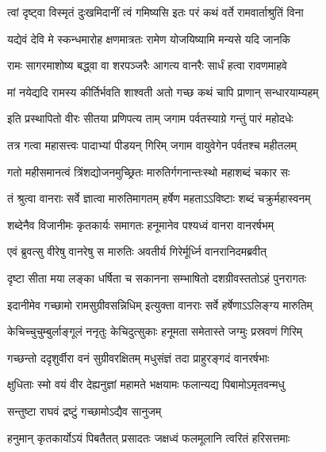 \twolineshloka
{त्वां दृष्ट्वा विस्मृतं दुःखमिदानीं त्वं गमिष्यसि}
{इतः परं कथं वर्ते रामवार्ताश्रुतिं विना} %


\twolineshloka
{यद्येवं देवि मे स्कन्धमारोह क्षणमात्रतः}
{रामेण योजयिष्यामि मन्यसे यदि जानकि} %


\twolineshloka
{रामः सागरमाशोष्य बद्\mbox{}ध्वा वा शरपञ्जरैः}
{आगत्य वानरैः सार्धं हत्वा रावणमाहवे} %

\twolineshloka
{मां नयेद्यदि रामस्य कीर्तिर्भवति शाश्वती}
{अतो गच्छ कथं चापि प्राणान् सन्धारयाम्यहम्} %

\twolineshloka
{इति प्रस्थापितो वीरः सीतया प्रणिपत्य ताम्}
{जगाम पर्वतस्याग्रे गन्तुं पारं महोदधेः} %

\twolineshloka
{तत्र गत्वा महासत्त्वः पादाभ्यां पीडयन् गिरिम्}
{जगाम वायुवेगेन पर्वतश्च महीतलम्} %

\twolineshloka
{गतो महीसमानत्वं त्रिंशद्योजनमुच्छ्रितः}
{मारुतिर्गगनान्तःस्थो महाशब्दं चकार सः} %

\twolineshloka
{तं श्रुत्वा वानराः सर्वे ज्ञात्वा मारुतिमागतम्}
{हर्षेण महताऽऽविष्टाः शब्दं चक्रुर्महास्वनम्} %

\twolineshloka
{शब्देनैव विजानीमः कृतकार्यः समागतः}
{हनूमानेव पश्यध्वं वानरा वानरर्षभम्} %

\twolineshloka
{एवं ब्रुवत्सु वीरेषु वानरेषु स मारुतिः}
{अवतीर्य गिरेर्मूर्ध्नि वानरानिदमब्रवीत्} %

\twolineshloka
{दृष्टा सीता मया लङ्का धर्षिता च सकानना}
{सम्भाषितो दशग्रीवस्ततोऽहं पुनरागतः} %

\twolineshloka
{इदानीमेव गच्छामो रामसुग्रीवसन्निधिम्}
{इत्युक्ता वानराः सर्वे हर्षेणाऽऽलिङ्ग्य मारुतिम्} %

\twolineshloka
{केचिच्चुचुम्बुर्लाङ्गूलं ननृतुः केचिदुत्सुकाः}
{हनूमता समेतास्ते जग्मुः प्रस्रवणं गिरिम्} %

\twolineshloka
{गच्छन्तो ददृशुर्वीरा वनं सुग्रीवरक्षितम्}
{मधुसंज्ञं तदा प्राहुरङ्गदं वानरर्षभाः} %

\twolineshloka
{क्षुधिताः स्मो वयं वीर देह्यनुज्ञां महामते}
{भक्षयामः फलान्यद्य पिबामोऽमृतवन्मधु} %

\onelineshloka
{सन्तुष्टा राघवं द्रष्टुं गच्छामोऽद्यैव सानुजम्} %


\twolineshloka
{हनुमान् कृतकार्योऽयं पिबतैतत् प्रसादतः}
{जक्षध्वं फलमूलानि त्वरितं हरिसत्तमाः} %


